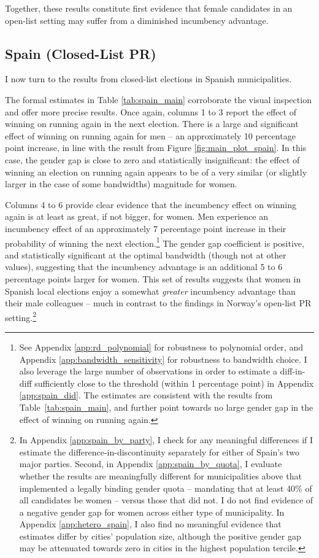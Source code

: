 \documentclass[12pt]{article}
\begin{document}
Together, these results constitute first evidence that female candidates in an open-list setting may suffer from a diminished incumbency advantage.

\subsection{Spain (Closed-List PR)}

I now turn to the results from closed-list elections in Spanish municipalities.

The formal estimates in Table \ref{tab:spain_main} corroborate the visual inspection and offer more precise results.
Once again, columns 1 to 3 report the effect of winning on running again in the next election.
There is a large and significant effect of winning on running again for men -- an approximately 10 percentage point increase, in line with the result from Figure \ref{fig:main_plot_spain}.
In this case, the gender gap is close to zero and statistically insignificant:
the effect of winning an election on running again appears to be of a very similar (or slightly larger in the case of some bandwidths) magnitude for women.



Columns 4 to 6 provide clear evidence that the incumbency effect on winning again is at least as great, if not bigger, for women.
Men experience an incumbency effect of an approximately 7 percentage point increase in their probability of winning the next election.\footnote{See Appendix \ref{app:rd_polynomial} for robustness to polynomial order, and Appendix \ref{app:bandwidth_sensitivity} for robustness to bandwidth choice. I also leverage the large number of observations in order to estimate a diff-in-diff sufficiently close to the threshold (within 1 percentage point) in Appendix \ref{app:spain_did}. The estimates are consistent with the results from Table~\ref{tab:spain_main}, and further point towards no large gender gap in the effect of winning on running again.} The gender gap coefficient is positive, and statistically significant at the optimal bandwidth (though not at other values), suggesting that the incumbency advantage is an additional 5 to 6 percentage points larger for women. This set of results suggests that women in Spanish local elections enjoy a somewhat \emph{greater} incumbency advantage than their male colleagues -- much in contrast to the findings in Norway's open-list PR setting.\footnote{In Appendix \ref{app:spain_by_party}, I check for any meaningful differences if I estimate the difference-in-discontinuity separately for either of Spain's two major parties. Second, in Appendix \ref{app:spain_by_quota}, I evaluate whether the results are meaningfully different for municipalities above that implemented a legally binding gender quota -- mandating that at least 40\% of all candidates be women -- versus those that did not. I do not find evidence of a negative gender gap for women across either type of municipality. In Appendix \ref{app:hetero_spain}, I also find no meaningful evidence that estimates differ by cities' population size, although the positive gender gap may be attenuated towards zero in cities in the highest population tercile.}
\end{document}
